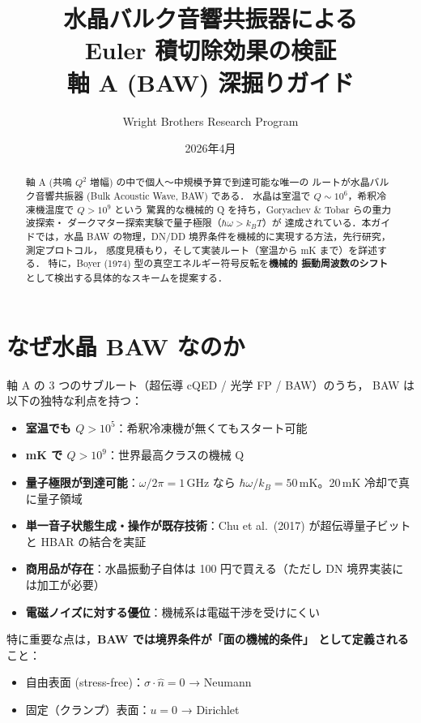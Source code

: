 \documentclass[11pt,a4paper]{article}
\title{水晶バルク音響共振器による\\
Euler 積切除効果の検証\\
\large 軸 A (BAW) 深掘りガイド}
\author{Wright Brothers Research Program}
\date{2026年4月}
\begin{document}
\maketitle

\begin{abstract}
軸 A (共鳴 $Q^2$ 増幅) の中で個人〜中規模予算で到達可能な唯一の
ルートが水晶バルク音響共振器 (Bulk Acoustic Wave, BAW) である．
水晶は室温で $Q\sim 10^6$，希釈冷凍機温度で $Q>10^9$ という
驚異的な機械的 Q を持ち，Goryachev \& Tobar らの重力波探索・
ダークマター探索実験で量子極限（$\hbar\omega > k_B T$）が
達成されている．本ガイドでは，水晶 BAW の物理，DN/DD
境界条件を機械的に実現する方法，先行研究，測定プロトコル，
感度見積もり，そして実装ルート（室温から mK まで）を詳述する．
特に，Boyer (1974) 型の真空エネルギー符号反転を\textbf{機械的
振動周波数のシフト}として検出する具体的なスキームを提案する．
\end{abstract}

\tableofcontents

\section{なぜ水晶 BAW なのか}

軸 A の 3 つのサブルート（超伝導 cQED / 光学 FP / BAW）のうち，
BAW は以下の独特な利点を持つ：

\begin{itemize}
\item \textbf{室温でも $Q>10^5$}：希釈冷凍機が無くてもスタート可能
\item \textbf{mK で $Q>10^9$}：世界最高クラスの機械 Q
\item \textbf{量子極限が到達可能}：$\omega/2\pi = 1$\,GHz なら
$\hbar\omega/k_B = 50$\,mK。20\,mK 冷却で真に量子領域
\item \textbf{単一音子状態生成・操作が既存技術}：Chu et al.\ (2017)
が超伝導量子ビットと HBAR の結合を実証
\item \textbf{商用品が存在}：水晶振動子自体は 100 円で買える（ただし
DN 境界実装には加工が必要）
\item \textbf{電磁ノイズに対する優位}：機械系は電磁干渉を受けにくい
\end{itemize}

特に重要な点は，\textbf{BAW では境界条件が「面の機械的条件」
として定義される}こと：
\begin{itemize}
\item 自由表面 (stress-free)：$\sigma \cdot \hat n = 0$ → Neumann
\item 固定（クランプ）表面：$u = 0$ → Dirichlet
\end{itemize}
\end{document}
